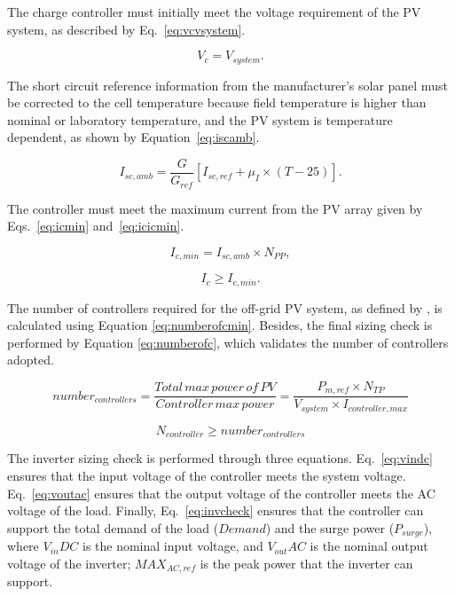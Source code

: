 \documentclass[runningheads]{llncs}
\begin{document}
The charge controller must initially meet the voltage requirement of the PV system, as described by Eq.~\eqref{eq:vcvsystem}.
 
\begin{equation}
\label{eq:vcvsystem}
V_{c} = V_{system}.
\end{equation}

The short circuit reference information from the manufacturer's solar panel must be corrected to the cell temperature because field temperature is higher than nominal or laboratory temperature, and the PV system is temperature dependent, as shown by Equation~\eqref{eq:iscamb}. 

\begin{equation}
\label{eq:iscamb}
I_{sc,amb} = \dfrac{G}{G_{ref}} \left[ I_{sc,ref} + \mu_{I} \times (T-25) \right]. 
\end{equation}

The controller must meet the maximum current from the PV array given by Eqs.~\eqref{eq:icmin} and~\eqref{eq:icicmin}.

\begin{equation}
\label{eq:icmin}
I_{c,min} = I_{sc,amb} \times N_{PP},
\end{equation}

\begin{equation}
\label{eq:icicmin}
I_{c} \geq I_{c,min}.
\end{equation}

The number of controllers required for the off-grid PV system, as defined by \cite{Yatimi}, is calculated using Equation \ref{eq:numberofcmin}. Besides, the final sizing check is performed by Equation \ref{eq:numberofc}, which validates the number of controllers adopted.

\begin{equation}
\label{eq:numberofcmin}
number_{controllers} = \dfrac{Total \, max \, power \, of \, PV}{Controller \, max \, power} = \dfrac{P_{m,ref} \times N_{TP}}{V_{system} \times I_{controller,max}}
\end{equation}

\begin{equation}
\label{eq:numberofc}
N_{controller} \geq number_{controllers}
\end{equation}

The inverter sizing check is performed through three equations. Eq.~\eqref{eq:vindc} ensures that the input voltage of the controller meets the system voltage. Eq.~\eqref{eq:voutac} ensures that the output voltage of the controller meets the AC voltage of the load. Finally, Eq.~\eqref{eq:invcheck} ensures that the controller can support the total demand of the load ($Demand$) and the surge power ($P_{surge}$), where $V_{in}DC$ is the nominal input voltage, and $V_{out}AC$ is the nominal output voltage of the inverter; $MAX_{AC,ref}$ is the peak power that the inverter can support.
\end{document}
